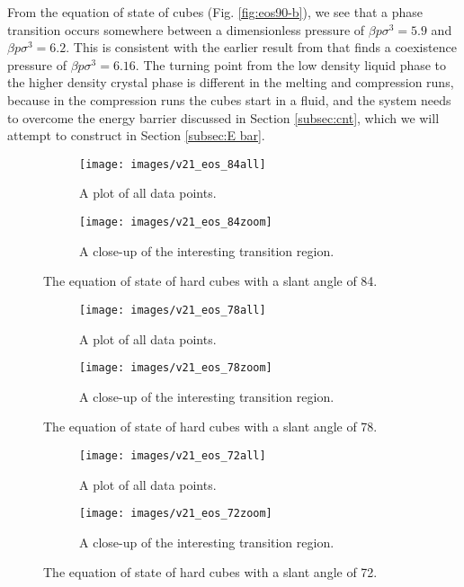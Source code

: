 \documentclass[thesis]{subfiles}
\begin{document}
From the equation of state of cubes (Fig. \ref{fig:eos90-b}), we see that a phase transition occurs somewhere between a dimensionless pressure of $\beta p \sigma^3 = 5.9$ and $\beta p \sigma^3 = 6.2$. This is consistent with the earlier result from \cite{smallenburg2012vacancy} that finds a coexistence pressure of $\beta p \sigma^3 = 6.16$. The turning point from the low density liquid phase to the higher density crystal phase is different in the melting and compression runs, because in the compression runs the cubes start in a fluid, and the system needs to overcome the energy barrier discussed in Section \ref{subsec:cnt}, which we will attempt to construct in Section \ref{subsec:E bar}.

\begin{figure}[h]
	\begin{subfigure}[t]{0.475\textwidth}
		\texttt{[image: images/v21\_eos\_84all]}
		\caption{A plot of all data points.}
		\label{fig:eos84-a}
	\end{subfigure}\hfill
	\begin{subfigure}[t]{0.475\textwidth}
		\texttt{[image: images/v21\_eos\_84zoom]}
		\caption{A close-up of the interesting transition region.}
		\label{fig:eos84-b}
	\end{subfigure}
	\caption{The equation of state of hard cubes with a slant angle of 84\degr.}
	\label{fig:eos84}
\end{figure}

\begin{figure}[h]
	\begin{subfigure}[t]{0.475\textwidth}
		\texttt{[image: images/v21\_eos\_78all]}
		\caption{A plot of all data points.}
		\label{fig:eos78-a}
	\end{subfigure}\hfill
	\begin{subfigure}[t]{0.475\textwidth}
		\texttt{[image: images/v21\_eos\_78zoom]}
		\caption{A close-up of the interesting transition region.}
		\label{fig:eos78-b}
	\end{subfigure}
	\caption{The equation of state of hard cubes with a slant angle of 78\degr.}
	\label{fig:eos78}
\end{figure}

\begin{figure}[h]
	\begin{subfigure}[t]{0.475\textwidth}
		\texttt{[image: images/v21\_eos\_72all]}
		\caption{A plot of all data points.}
		\label{fig:eos72-a}
	\end{subfigure}\hfill
	\begin{subfigure}[t]{0.475\textwidth}
		\texttt{[image: images/v21\_eos\_72zoom]}
		\caption{A close-up of the interesting transition region.}
		\label{fig:eos72-b}
	\end{subfigure}
	\caption{The equation of state of hard cubes with a slant angle of 72\degr.}
	\label{fig:eos72}
\end{figure}
\end{document}
